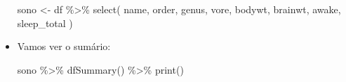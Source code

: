 \documentclass[
  11pt]{report}
\newenvironment{Shaded}{\begin{snugshade}}{\end{snugshade}}
\newcommand{\FunctionTok}[1]{\textcolor[rgb]{0.00,0.00,0.00}{#1}}
\newcommand{\NormalTok}[1]{#1}
\newcommand{\OtherTok}[1]{\textcolor[rgb]{0.56,0.35,0.01}{#1}}
\newcommand{\SpecialCharTok}[1]{\textcolor[rgb]{0.00,0.00,0.00}{#1}}
\begin{document}
\begin{itemize}
\begin{Shaded}
\begin{Highlighting}[]
\NormalTok{sono }\OtherTok{\textless{}{-}}\NormalTok{ df }\SpecialCharTok{\%\textgreater{}\%} 
  \FunctionTok{select}\NormalTok{(}
\NormalTok{    name, order, genus, vore, bodywt, }
\NormalTok{    brainwt, awake, sleep\_total}
\NormalTok{  )}
\end{Highlighting}
\end{Shaded}
\item
  Vamos ver o sumário:

\begin{Shaded}
\begin{Highlighting}[]
\NormalTok{sono }\SpecialCharTok{\%\textgreater{}\%} \FunctionTok{dfSummary}\NormalTok{() }\SpecialCharTok{\%\textgreater{}\%} \FunctionTok{print}\NormalTok{()}
\end{Highlighting}
\end{Shaded}


\end{itemize}
\end{document}

